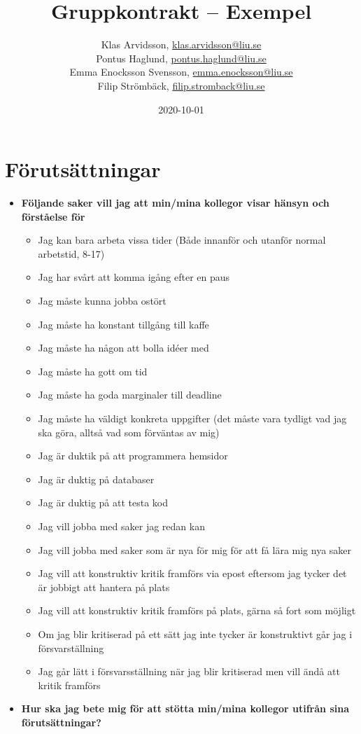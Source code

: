 \documentclass{mall}
\author{Klas Arvidsson, \url{klas.arvidsson@liu.se}\\
  Pontus Haglund, \url{pontus.haglund@liu.se}\\
  Emma Enocksson Svensson, \url{emma.enocksson@liu.se}\\
  Filip Strömbäck, \url{filip.stromback@liu.se}}
\title{Gruppkontrakt -- Exempel}
\date{2020-10-01}
\begin{document}
\projectpage

\section{Förutsättningar}
\label{prereq}

\begin{itemize}
\item \textbf{Följande saker vill jag att min/mina kollegor visar hänsyn och förståelse för}

  \begin{itemize}
  \item Jag kan bara arbeta vissa tider (Både innanför och utanför normal arbetstid, 8-17)
  \item Jag har svårt att komma igång efter en paus
  \item Jag måste kunna jobba ostört
  \item Jag måste ha konstant tillgång till kaffe
  \item Jag måste ha någon att bolla idéer med
  \item Jag måste ha gott om tid
  \item Jag måste ha goda marginaler till deadline
  \item Jag måste ha väldigt konkreta uppgifter (det måste vara tydligt vad jag ska göra, alltså vad
    som förväntas av mig)
  \item Jag är duktik på att programmera hemsidor
  \item Jag är duktig på databaser
  \item Jag är duktig på att testa kod
  \item Jag vill jobba med saker jag redan kan
  \item Jag vill jobba med saker som är nya för mig för att få lära mig nya saker
  \item Jag vill att konstruktiv kritik framförs via epost eftersom jag tycker det är jobbigt att hantera på plats
  \item Jag vill att konstruktiv kritik framförs på plats, gärna så fort som möjligt
  \item Om jag blir kritiserad på ett sätt jag inte tycker är konstruktivt går jag i försvarställning
  \item Jag går lätt i försvarsställning när jag blir kritiserad men vill ändå att kritik framförs
  \end{itemize}

\item \textbf{Hur ska jag bete mig för att stötta min/mina kollegor utifrån sina förutsättningar?}


\end{itemize}
\end{document}
